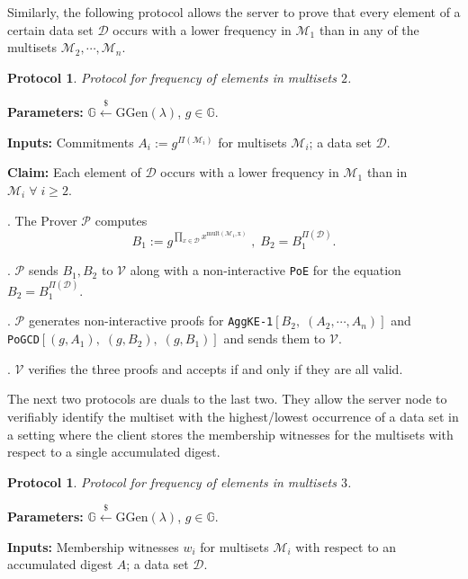 \documentclass[11pt, lettersize, notitlepage, leqno, footskip=0.6cm]{article}
\newcommand{\pl}{\prod\limits}
\newcommand{\mc}{\mathcal}
\newcommand{\mb}{\mathbb}
\newcommand{\mr}{\mathrm}
\newcommand{\lamb}{\lambda}
\newcommand{\mP}{\mc{P}}
\newcommand{\V}{\mc{V}}
\newcommand{\vs}{\vspace{-0.15cm}}
\newcommand{\noin}{\noindent}
\newtheorem{Prot}[Thm]{Protocol}
\numberwithin{equation}{section}
\begin{document}
Similarly, the following protocol allows the server to prove that every element of a certain data set $\mc{D}$ occurs with a lower frequency in $\mc{M}_1$ than in any of the multisets $\mc{M}_2,\cdots,\mc{M}_n$.

\begin{Prot} Protocol for frequency of elements in multisets $2$.\end{Prot} \vspace{-0.3cm}

\noin \textbf{Parameters:} $\mb{G}\xleftarrow{\$} \mr{GGen}(\lamb)$,\; $g\in \mb{G}$.

\noin \textbf{Inputs:} Commitments $A_i := g^{\Pi(\mc{M}_i)}$ for multisets $\mc{M}_i$; a data set $\mc{D}$.

\noin \textbf{Claim:} Each element of $\mc{D}$ occurs with a lower frequency in $\mc{M}_1$ than in $\mc{M}_i\;\forall\;i\geq 2$.

\begin{prf1}\noin {}. The Prover $\mP$ computes \vs $$B_1:= g^{\pl_{x\in\mc{D}} x^{\mr{mult(\mc{M}_1, x)}}}\;,\; B_2 = B_1^{\Pi(\mc{D})}.$$

\noin 2. $\mP$ sends $B_1, B_2$ to $\V$ along with a non-interactive \verb|PoE| for the equation $B_2= B_1^{\Pi(\mc{D})}$.

\noin 3. $\mP$ generates non-interactive proofs for \verb|AggKE-1|$[B_2,\;(A_2,\cdots,A_n)]$ and\\ \verb|PoGCD|$[(g, A_1),\;(g, B_2),\;(g,B_1)]$ and sends them to $\V$.

\noin 4. $\V$ verifies the three proofs and accepts if and only if they are all valid.\end{prf1}


\bigskip

\noin The next two protocols are duals to the last two. They allow the server node to verifiably identify the multiset with the highest/lowest occurrence of a data set in a setting where the client stores the membership witnesses for the multisets with respect to a single accumulated digest.

\begin{Prot} Protocol for frequency of elements in multisets $3$.\end{Prot} \vspace{-0.3cm}

\noin \textbf{Parameters:} $\mb{G}\xleftarrow{\$} \mr{GGen}(\lamb)$,\; $g\in \mb{G}$.

\noin \textbf{Inputs:} Membership witnesses $w_i$ for multisets $\mc{M}_i$ with respect to an accumulated digest $A$; a data set $\mc{D}$.
\end{document}
